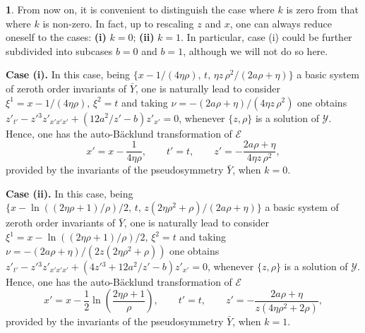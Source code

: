 \documentclass[12pt,english]{elsarticle}
\theoremstyle{plain}
\theoremstyle{plain}
\theoremstyle{remark}
\theoremstyle{plain}
\theoremstyle{definition}
\theoremstyle{definition}
\newtheorem{example}[thm]{\protect\examplename}
\providecommand{\examplename}{Example}
\begin{document}
\begin{example}
From now on, it is convenient to distinguish the case where $k$ is zero
from that where $k$ is non-zero. In fact, up to rescaling $z$ and
$x$, one can always reduce oneself to the cases: \textbf{(i)} $k=0$;
\textbf{(ii)} $k=1$. In particular, case (i) could be further subdivided
into subcases $b=0$ and $b=1$, although we will not do so here.

\textbf{Case (i).} In this case, being
$\{x-1/(4\eta \rho ),\,t,\,\eta z\,\rho ^{2}/(2a\rho +\eta )\}$ a basic
system of zeroth order invariants of $\bar{Y}$, one is naturally lead to
consider $\xi ^{1}=x-1/(4\eta \rho ),\,\xi ^{2}=t$ and taking
$\nu =-(2a\rho +\eta )/(4\eta z\,\rho ^{2})$ one obtains
$z'_{t'}-z'{}^{3}z'_{x'x'x'}+\left (12a^{2}/z'-b\right )z'_{x'}=0$, whenever
$\{z,\rho \}$ is a solution of $\mathcal{Y}$. Hence, one has the auto-B\"{a}cklund
transformation of $\mathcal{E}$
%
\begin{equation*}
x'=x-\frac{1}{4\eta \rho},\qquad t'=t,\qquad z'=-
\frac{2a\rho +\eta}{4\eta z\,\rho ^{2}},
\end{equation*}
%
provided by the invariants of the pseudosymmetry $\bar{Y}$, when
$k=0$.

\textbf{Case (ii).} In this case, being
$\{x-\ln ((2\eta \rho +1)/\rho )/2,\,t,\,z(2\eta \rho ^{2}+\rho )/(2a
\rho +\eta )\}$ a basic system of zeroth order invariants of
$\bar{Y}$, one is naturally lead to consider
$\xi ^{1}=x-\ln ((2\eta \rho +1)/\rho )/2,\,\xi ^{2}=t$ and taking
$\nu =-(2a\rho +\eta )/(2z(2\eta \rho ^{2}+\rho ))$ one obtains
$z'_{t'}-z'{}^{3}z'_{x'x'x'}+\left (4z'{}^{3}+12a^{2}/z'-b\right )z'_{x'}=0$,
whenever $\{z,\rho \}$ is a solution of $\mathcal{Y}$. Hence, one has the
auto-B\"{a}cklund transformation of $\mathcal{E}$
%
\begin{equation*}
x'=x-\frac{1}{2}\ln \left (\frac{2\eta \rho +1}{\rho}\right ),\qquad t'=t,
\qquad z'=-\frac{2a\rho +\eta}{z(4\eta \rho ^{2}+2\rho )},
\end{equation*}
%
provided by the invariants of the pseudosymmetry $\bar{Y}$, when
$k=1$.
\end{example}
\end{document}
